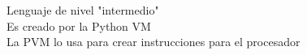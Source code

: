 \documentclass[preview]{standalone}
\begin{document}
Lenguaje de nivel "intermedio"\\Es creado por la Python VM\\La PVM lo usa para crear instrucciones para el procesador\\
\end{document}
